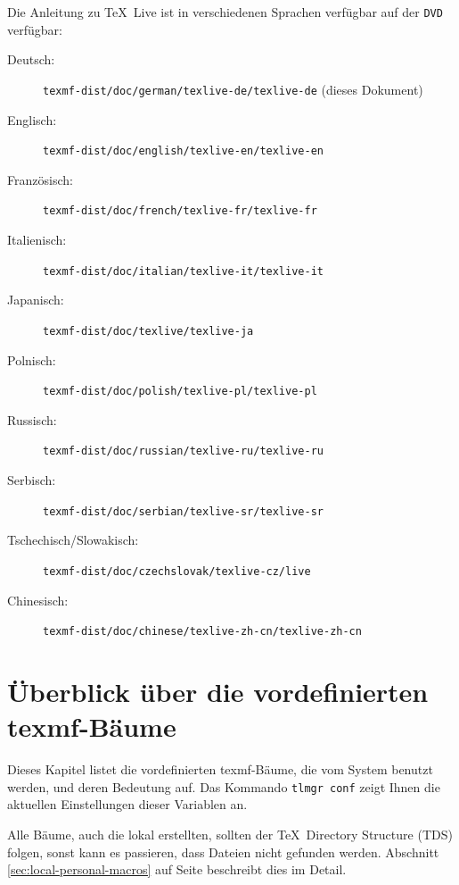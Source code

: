\documentclass[12pt,ngerman,a4paper,fullparskip]{scrreprt}
\newcommand{\TL}{\TeX\ Live\xspace}
\newcommand{\acro}[1]{\texttt{#1}}
\newcommand{\OnCD}[1]{\texttt{#1}}
\providecommand*{\DVD}{\acro{DVD}\xspace}
\begin{document}
Die Anleitung zu \TL ist in verschiedenen Sprachen verfügbar auf der \DVD verfügbar:
\begin{description}
\item[Deutsch:]                \OnCD{texmf-dist/doc/german/texlive-de/texlive-de} (dieses Dokument)
\item[Englisch:]               \OnCD{texmf-dist/doc/english/texlive-en/texlive-en}
\item[Französisch:]            \OnCD{texmf-dist/doc/french/texlive-fr/texlive-fr}
\item[Italienisch:]              \OnCD{texmf-dist/doc/italian/texlive-it/texlive-it}
\item[Japanisch:]  					\OnCD{texmf-dist/doc/texlive/texlive-ja}
\item[Polnisch:]               \OnCD{texmf-dist/doc/polish/texlive-pl/texlive-pl}
\item[Russisch:]               \OnCD{texmf-dist/doc/russian/texlive-ru/texlive-ru}
\item[Serbisch:]               \OnCD{texmf-dist/doc/serbian/texlive-sr/texlive-sr}
\item[Tschechisch/Slowakisch:] \OnCD{texmf-dist/doc/czechslovak/texlive-cz/live}
\item[Chinesisch:]             \OnCD{texmf-dist/doc/chinese/texlive-zh-cn/texlive-zh-cn}
\end{description}

\section{Überblick über die vordefinierten texmf-Bäume}\label{sec:texmftrees}

Dieses Kapitel listet die vordefinierten texmf-Bäume, die vom System benutzt
werden, und deren Bedeutung auf. Das Kommando \texttt{tlmgr~conf}
zeigt Ihnen die aktuellen Einstellungen dieser Variablen an.

Alle Bäume, auch die lokal erstellten, sollten der \TeX\ Directory Structure (TDS) folgen, sonst kann es passieren, dass Dateien nicht gefunden werden. Abschnitt \ref{sec:local-personal-macros} auf Seite \pageref{sec:local-personal-macros} beschreibt dies im Detail.
\end{document}
